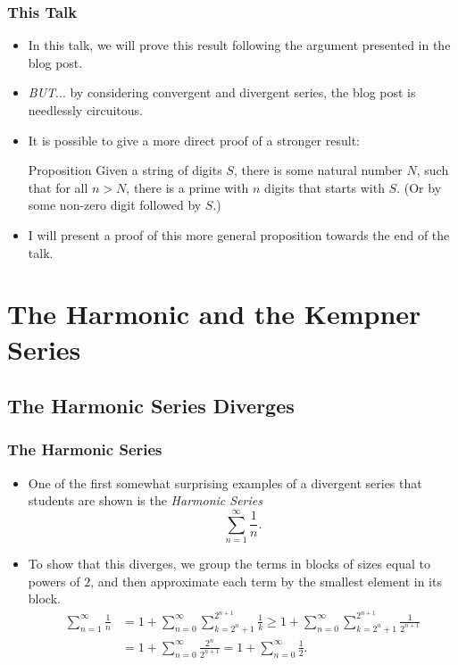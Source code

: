 \documentclass{beamer}
\begin{document}
\begin{frame}
    \frametitle{This Talk}

    \begin{itemize}
        \item In this talk, we will prove this result following the argument presented in the blog post. \pause
        \item \emph{BUT}... by considering convergent and divergent series, the blog post is needlessly circuitous. \pause
        \item It is possible to give a more direct proof of a stronger result:
        \begin{block}{Proposition}
            Given a string of digits $S$, there is some natural number $N$, such that for all $n > N$, there is a prime with $n$ digits that starts with $S$. (Or by some non-zero digit followed by $S$.)
        \end{block} \pause
        \item I will present a proof of this more general proposition towards the end of the talk.
    \end{itemize}

\end{frame}

\section{The Harmonic and the Kempner Series}
\subsection{The Harmonic Series Diverges}

\begin{frame}
    \frametitle{The Harmonic Series}

    \begin{itemize}
        \item One of the first somewhat surprising examples of a divergent series that students are shown is the \emph{Harmonic Series}
        \[
            \sum_{n = 1}^{\infty} \frac{1}{n}.
        \]
        \item To show that this diverges, we group the terms in blocks of sizes equal to powers of $2$, and then approximate each term by the smallest element in its block.
        \begin{align*}
            \sum_{n = 1}^{\infty} \frac{1}{n} & = 1 + \sum_{n = 0}^{\infty} \sum_{k = 2^n + 1}^{2^{n + 1}} \frac{1}{k} \geq 1 + \sum_{n = 0}^\infty \sum_{k = 2^n + 1}^{2^{n + 1}} \frac{1}{2^{n + 1}} \\
            & = 1 + \sum_{n = 0}^{\infty} \frac{2^n}{2^{n + 1}} = 1 + \sum_{n = 0}^{\infty} \frac{1}{2}.
        \end{align*}
    \end{itemize}

\end{frame}
\end{document}
